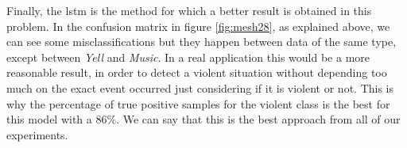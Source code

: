 	Finally, the \acrshort{lstm} is the method for which a better result is obtained in this problem. In the confusion matrix in figure \ref{fig:mesh28}, as explained above, we can see some misclassifications but they happen between data of the same type, except between \textit{Yell} and \textit{Music}. In a real application this would be a more reasonable result, in order to detect a violent situation without depending too much on the exact event occurred just considering if it is violent or not. This is why the percentage of true positive samples for the violent class is the best for this model with a $86\%$. We can say that this is the best approach from all of our experiments. %

		
	